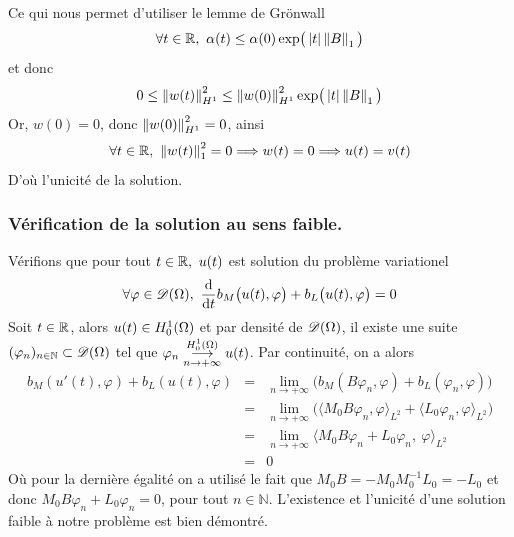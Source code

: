 Ce qui nous permet d'utiliser le lemme de Grönwall
\begin{eqnarray*}
    \forall t \in \mathbb{R}, \ \alpha(t) \leq \alpha(0)\exp\bigr(\displaystyle\left\lvert t \right\rvert\left\lVert B \right\rVert_1\bigl)
\end{eqnarray*}
et donc
\begin{eqnarray*}
    0 \leq \left\lVert w(t) \right\rVert^2_{H^1} \leq \left\lVert w(0) \right\rVert^2_{H^1} \exp\bigr(\displaystyle\left\lvert t \right\rvert\left\lVert B \right\rVert_1\bigl)
\end{eqnarray*}
Or, $w(0) = 0$, donc $\left\lVert w(0) \right\rVert^2_{H^1}=0$, ainsi
\begin{eqnarray*}
    \forall t \in \mathbb{R}, \ \left\lVert w(t) \right\rVert^2_1 = 0 \Longrightarrow w(t) = 0
    \Longrightarrow u(t) = v(t)
\end{eqnarray*}
D'où l'unicité de la solution.

\subsubsection*{Vérification de la solution au sens faible.}
Vérifions que pour tout $t \in \bbR,\ u(t)$ est solution du problème variationel
\begin{eqnarray*}
    \forall \varphi \in \scrD,\ \frac{\mathrm{d}}{\mathrm{d}t}b_M\big(u(t),\varphi\big) + b_L\big(u(t),\varphi\big) = 0
\end{eqnarray*}
Soit $t\in\mathbb{R}$, alors $u(t) \in H^1_0(\Omega)$ et par densité de $\mathscr{D}(\Omega)$, il existe une suite $(\varphi_n)_{n\in \mathbb{N}} \subset \mathscr{D}(\Omega)$ tel que $\varphi_n \overunderset{\Hone}{n\rightarrow + \infty}\longrightarrow u(t)$. Par continuité, on a alors
\begin{eqnarray*}
    b_M(u'(t), \varphi) + b_L(u(t), \varphi) &=& \lim_{n \to +\infty} \big(b_M(B\varphi_n, \varphi) + b_L(\varphi_n,\varphi)\big) \\
    &=& \lim_{n\to +\infty} \big(\langle M_0B\varphi_n, \varphi\rangle_{L^2} + \langle L_0\varphi_n, \varphi\rangle_{L^2}\big) \\
    &=& \lim_{n \to +\infty} \langle M_0B\varphi_n + L_0\varphi_n,\ \varphi\rangle_{L^2} \\
    &=& 0
\end{eqnarray*}
Où pour la dernière égalité on a utilisé le fait que $M_0B = -M_0M^{-1}_0L_0 = -L_0$ et donc $M_0B\varphi_n+ L_0\varphi_n = 0$, pour tout $n \in \mathbb{N}$. L'existence et l'unicité d'une solution faible à notre problème est bien démontré.

